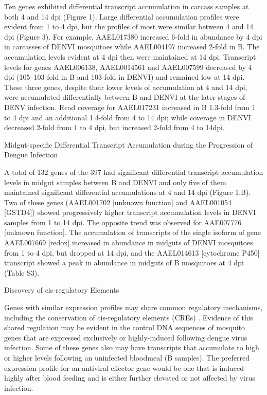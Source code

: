 Ten genes exhibited differential transcript accumulation in carcass samples at both 4 and 14 dpi (Figure 1).
Large differential accumulation profiles were evident from 1 to 4 dpi, but the profiles of most were similar between 4 and 14 dpi (Figure 3).
For example, AAEL017380 increased 6-fold in abundance by 4 dpi in carcasses of DENVI mosquitoes while AAEL004197 increased 2-fold in B.
The accumulation levels evident at 4 dpi then were maintained at 14 dpi.
Transcript levels for genes AAEL006138, AAEL0014561 and AAEL007599 decreased by 4 dpi (105–103 fold in B and 103-fold in DENVI) and remained low at 14 dpi.
These three genes, despite their lower levels of accumulation at 4 and 14 dpi, were accumulated differentially between B and DENVI at the later stages of DENV infection.
Read coverage for AAEL017231 increased in B 1.3-fold from 1 to 4 dpi and an additional 1.4-fold from 4 to 14 dpi; while coverage in DENVI decreased 2-fold from 1 to 4 dpi, but increased 2-fold from 4 to 14dpi.

Midgut-specific Differential Transcript Accumulation during the Progression of Dengue Infection

A total of 132 genes of the 397 had significant differential transcript accumulation levels in midgut samples between B and DENVI and only five of them maintained significant differential accumulations at 4 and 14 dpi (Figure 1.B).
Two of these genes (AAEL001702 [unknown function] and AAEL001054 [GSTD4]) showed progressively higher transcript accumulation levels in DENVI samples from 1 to 14 dpi.
The opposite trend was observed for AAE007776 [unknown function].
The accumulation of transcripts of the single isoform of gene AAEL007669 [redox] increased in abundance in midguts of DENVI mosquitoes from 1 to 4 dpi, but dropped at 14 dpi, and the AAEL014613 [cytochrome P450] transcript showed a peak in abundance in midguts of B mosquitoes at 4 dpi (Table S3).

Discovery of cis-regulatory Elements

Genes with similar expression profiles may share common regulatory mechanisms, including the conservation of cis-regulatory elements (CREs) \cite{Sieglaff2009}.
Evidence of this shared regulation may be evident in the control DNA sequences of mosquito genes that are expressed exclusively or highly-induced following dengue virus infection.
Some of these genes also may have transcripts that accumulate to high or higher levels following an uninfected bloodmeal (B samples).
The preferred expression profile for an antiviral effector gene would be one that is induced highly after blood feeding and is either further elevated or not affected by virus infection.

